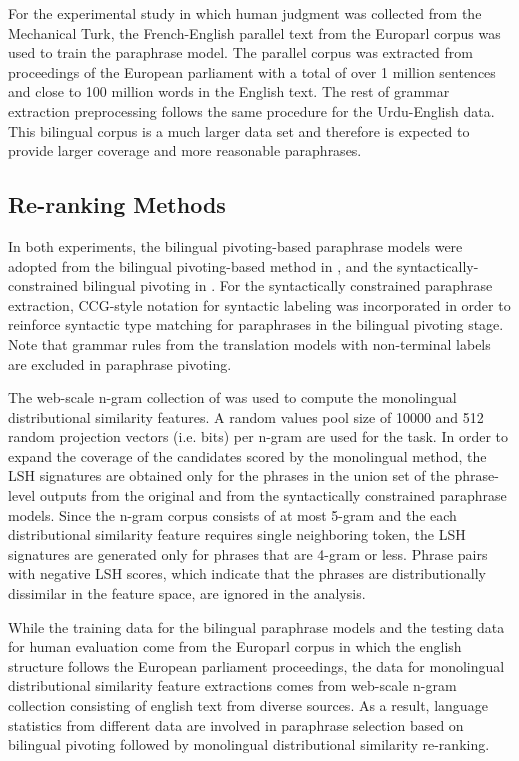 \documentclass[11pt]{article}
\begin{document}
For the experimental study in which human judgment was collected from the Mechanical Turk, the French-English parallel text from the Europarl corpus \cite{Koehn05} was used to train the paraphrase model. The parallel corpus was extracted from proceedings of the European parliament with a total of over 1 million sentences and close to 100 million words in the English text. The rest of grammar extraction preprocessing follows the same procedure for the Urdu-English data. This bilingual corpus is a much larger data set and therefore is expected to provide larger coverage and more reasonable paraphrases.

\subsection{Re-ranking Methods}
In both experiments, the bilingual pivoting-based paraphrase models were adopted from the bilingual pivoting-based method in , and the syntactically-constrained bilingual pivoting in . For the syntactically constrained paraphrase extraction, CCG-style notation for syntactic labeling \cite{Steedman99} was incorporated in order to reinforce syntactic type matching for paraphrases in the bilingual pivoting stage. Note that grammar rules from the translation models with non-terminal labels are excluded in paraphrase pivoting.

The web-scale n-gram collection of  was used to compute the monolingual distributional similarity features. A random values pool size of 10000 and 512 random projection vectors (i.e. bits) per n-gram are used for the task. In order to expand the coverage of the candidates scored by the monolingual method, the LSH signatures are obtained only for the phrases in the union set of the phrase-level outputs from the original and from the syntactically constrained paraphrase models. Since the n-gram corpus consists of at most 5-gram and the each distributional similarity feature requires single neighboring token, the LSH signatures are generated only for phrases that are 4-gram or less. Phrase pairs with negative LSH scores, which indicate that the phrases are distributionally dissimilar in the feature space, are ignored in the analysis.

While the training data for the bilingual paraphrase models and the testing data for human evaluation come from the Europarl corpus in which the english structure follows the European parliament proceedings, the data for monolingual distributional similarity feature extractions comes from web-scale n-gram collection consisting of english text from diverse sources. As a result, language statistics from different data are involved in paraphrase selection based on bilingual pivoting followed by monolingual distributional similarity re-ranking.
\end{document}

